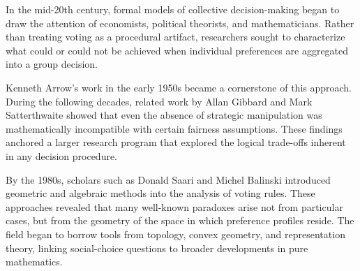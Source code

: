 \begin{historical}
In the mid-20th century, formal models of collective decision-making began to draw the attention of economists, political theorists, and mathematicians. Rather than treating voting as a procedural artifact, researchers sought to characterize what could or could not be achieved when individual preferences are aggregated into a group decision.

Kenneth Arrow’s work in the early 1950s became a cornerstone of this approach. During the following decades, related work by Allan Gibbard and Mark Satterthwaite showed that even the absence of strategic manipulation was mathematically incompatible with certain fairness assumptions. These findings anchored a larger research program that explored the logical trade-offs inherent in any decision procedure.

By the 1980s, scholars such as Donald Saari and Michel Balinski introduced geometric and algebraic methods into the analysis of voting rules. These approaches revealed that many well-known paradoxes arise not from particular cases, but from the geometry of the space in which preference profiles reside. The field began to borrow tools from topology, convex geometry, and representation theory, linking social-choice questions to broader developments in pure mathematics.
\end{historical}
